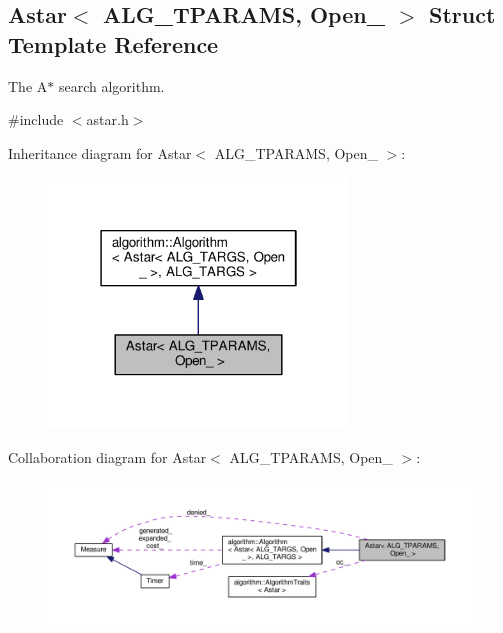\hypertarget{structAstar}{}\subsection{Astar$<$ A\+L\+G\+\_\+\+T\+P\+A\+R\+A\+MS, Open\+\_\+ $>$ Struct Template Reference}
\label{structAstar}


The {\ttfamily A$\ast$} search algorithm.  




{\ttfamily \#include $<$astar.\+h$>$}



Inheritance diagram for Astar$<$ A\+L\+G\+\_\+\+T\+P\+A\+R\+A\+MS, Open\+\_\+ $>$\+:\nopagebreak
\begin{figure}[H]
\begin{center}
\leavevmode
\includegraphics[width=226pt]{structAstar__inherit__graph}
\end{center}
\end{figure}


Collaboration diagram for Astar$<$ A\+L\+G\+\_\+\+T\+P\+A\+R\+A\+MS, Open\+\_\+ $>$\+:\nopagebreak
\begin{figure}[H]
\begin{center}
\leavevmode
\includegraphics[width=350pt]{structAstar__coll__graph}
\end{center}
\end{figure}
